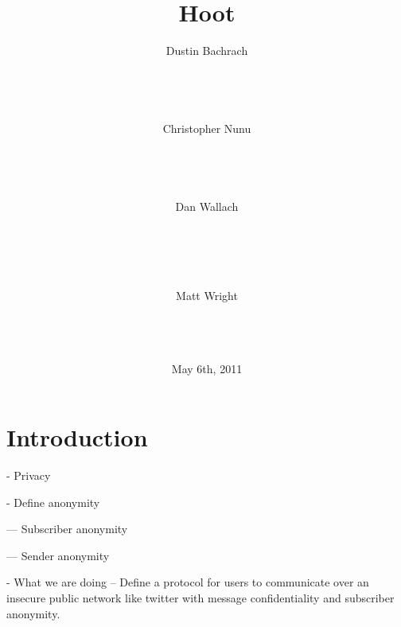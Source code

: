 \documentclass{acm_proc_article-sp}
\begin{document}

\author{
\alignauthor
	Dustin Bachrach\\
	\\
	\\
	\\
	
\alignauthor
 	Christopher Nunu\\
	\\
	\\
	\\
	
\alignauthor
	Dan Wallach\\
	\\
	\\
	\\
	\\

\and
\alignauthor
	Matt Wright\\
	\\
	\\
	\\
}

\title{Hoot}
\date{May 6th, 2011}

\maketitle

\begin{abstract}

\end{abstract}

\section{Introduction}

- Privacy

- Define anonymity

--- Subscriber anonymity

--- Sender anonymity

- What we are doing
-- Define a protocol for users to communicate over an insecure public network like twitter with message confidentiality and subscriber anonymity. 
\end{document}

